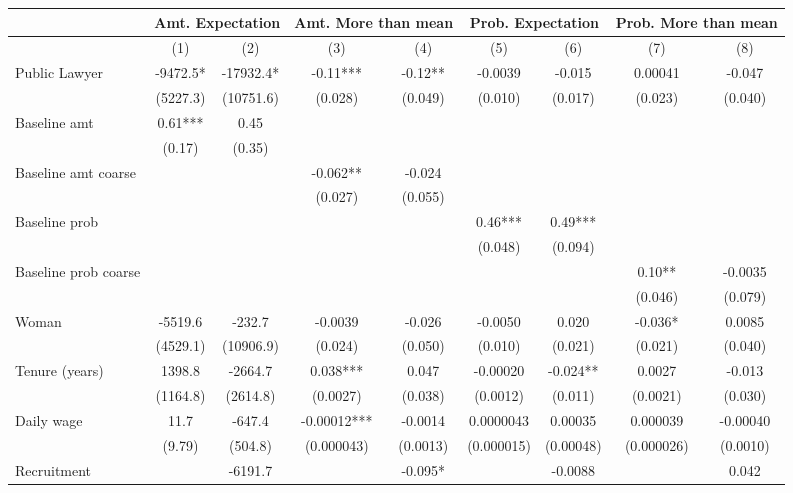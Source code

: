 \begin{tabular}{lcccccccc}
\toprule
      & \multicolumn{2}{c}{Amt. Expectation} & \multicolumn{2}{c}{Amt. More than mean} & \multicolumn{2}{c}{Prob. Expectation} & \multicolumn{2}{c}{Prob. More than mean} \\
\midrule
\midrule
      & (1)   & (2)   & (3)   & (4)   & (5)   & (6)   & (7)   & (8) \\
\midrule
\midrule
Public Lawyer & -9472.5* & -17932.4* & -0.11*** & -0.12** & -0.0039 & -0.015 & 0.00041 & -0.047 \\
      & (5227.3) & (10751.6) & (0.028) & (0.049) & (0.010) & (0.017) & (0.023) & (0.040) \\
Baseline amt   & 0.61*** & 0.45  &       &       &       &       &       &  \\
      & (0.17) & (0.35) &       &       &       &       &       &  \\
Baseline amt coarse &       &       & -0.062** & -0.024 &       &       &       &  \\
      &       &       & (0.027) & (0.055) &       &       &       &  \\
Baseline prob &       &       &       &       & 0.46*** & 0.49*** &       &  \\
      &       &       &       &       & (0.048) & (0.094) &       &  \\
Baseline prob coarse &       &       &       &       &       &       & 0.10** & -0.0035 \\
      &       &       &       &       &       &       & (0.046) & (0.079) \\
Woman & -5519.6 & -232.7 & -0.0039 & -0.026 & -0.0050 & 0.020 & -0.036* & 0.0085 \\
      & (4529.1) & (10906.9) & (0.024) & (0.050) & (0.010) & (0.021) & (0.021) & (0.040) \\
Tenure (years) & 1398.8 & -2664.7 & 0.038*** & 0.047 & -0.00020 & -0.024** & 0.0027 & -0.013 \\
      & (1164.8) & (2614.8) & (0.0027) & (0.038) & (0.0012) & (0.011) & (0.0021) & (0.030) \\
Daily wage & 11.7  & -647.4 & -0.00012*** & -0.0014 & 0.0000043 & 0.00035 & 0.000039 & -0.00040 \\
      & (9.79) & (504.8) & (0.000043) & (0.0013) & (0.000015) & (0.00048) & (0.000026) & (0.0010) \\
Recruitment &       & -6191.7 &       & -0.095* &       & -0.0088 &       & 0.042 \\

\end{tabular}
